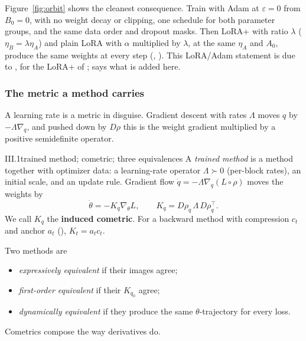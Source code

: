 Figure~\ref{fig:orbit} shows the cleanest consequence. Train with Adam at $\varepsilon=0$ from $B_0=0$, with no weight decay or clipping, one schedule for both parameter groups, and the same data order and dropout masks. Then LoRA+ with ratio $\lambda$ ($\eta_B=\lambda\eta_A$) and plain LoRA with $\alpha$ multiplied by $\lambda$, at the same $\eta_A$ and $A_0$, produce the same weights at every step (, ). This LoRA/Adam statement is due to \citet{schulman2025lora}, for the LoRA+ of \citet{hayou2024lora};  says what is added here.

\subsubsection{The metric a method carries}\label{sec:fibres-cometric}

A learning rate is a metric in disguise. Gradient descent with rates $\Lambda$ moves $q$ by $-\Lambda\nabla_q$, and pushed down by $D\rho$ this is the weight gradient multiplied by a positive semidefinite operator.

\begin{definition}{III.1}{trained method; cometric; three equivalences}
A \emph{trained method} is a method together with optimizer data: a learning-rate operator $\Lambda\succ0$ (per-block rates), an initial scale, and an update rule. Gradient flow $\dot q=-\Lambda\nabla_q(L\circ\rho)$ moves the weights by
\[\dot\theta=-K_q\nabla_\theta L,\qquad K_q=D\rho_q\,\Lambda\,D\rho_q^\top.\]
We call $K_q$ the \textbf{induced cometric}. For a backward method with compression $c_t$ and anchor $a_t$ (), $K_t=a_tc_t$.

Two methods are
\begin{itemize}
\item \emph{expressively equivalent} if their images agree;
\item \emph{first-order equivalent} if their $K_{q_0}$ agree;
\item \emph{dynamically equivalent} if they produce the same $\theta$-trajectory for every loss.
\end{itemize}
\end{definition}

Cometrics compose the way derivatives do.

